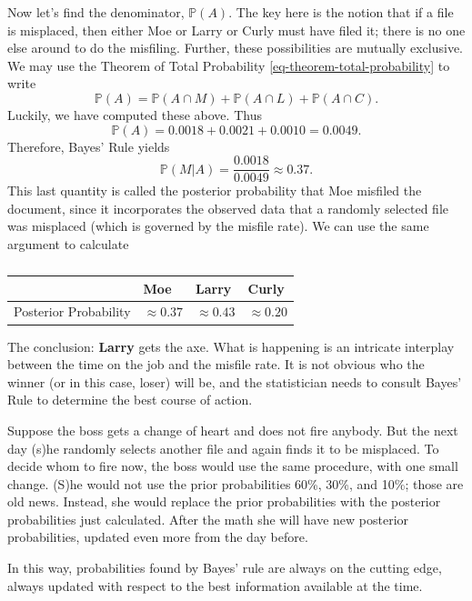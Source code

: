 \documentclass[captions=tableheading]{scrbook}
\begin{document}
\begin{example}
Now let's find the denominator, \(\mathbb{P}(A)\). The key here is the notion that if a file is misplaced, then either Moe or Larry or Curly must have filed it; there is no one else around to do the misfiling. Further, these possibilities are mutually exclusive. We may use the Theorem of Total Probability \ref{eq-theorem-total-probability} to write
\[ 
\mathbb{P}(A)=\mathbb{P}(A\cap M)+\mathbb{P}(A\cap L)+\mathbb{P}(A\cap C).
\]
Luckily, we have computed these above. Thus
\[
\mathbb{P}(A)=0.0018+0.0021+0.0010=0.0049.
\]
Therefore, Bayes' Rule yields
\[
\mathbb{P}(M|A)=\frac{0.0018}{0.0049}\approx0.37.
\]
This last quantity is called the posterior probability that Moe misfiled the document, since it incorporates the observed data that a randomly selected file was misplaced (which is governed by the misfile rate). We can use the same argument to calculate

\begin{table}[htb]
\caption[Misfiling assistants: posterior]{} 
\begin{center}
\begin{tabular}{llll}
                        &  Moe              &  Larry            &  Curly            \\
\hline
 Posterior Probability  &  \(\approx0.37\)  &  \(\approx0.43\)  &  \(\approx0.20\)  \\
\end{tabular}
\end{center}
\end{table}

The conclusion: \textbf{Larry} gets the axe. What is happening is an intricate interplay between the time on the job and the misfile rate. It is not obvious who the winner (or in this case, loser) will be, and the statistician needs to consult Bayes' Rule to determine the best course of action.
\end{example}

\begin{example}
Suppose the boss gets a change of heart and does not fire anybody. But the next day (s)he randomly selects another file and again finds it to be misplaced. To decide whom to fire now, the boss would use the same procedure, with one small change. (S)he would not use the prior probabilities 60\%, 30\%, and 10\%; those are old news. Instead, she would replace the prior probabilities with the posterior probabilities just calculated. After the math she will have new posterior probabilities, updated even more from the day before.

In this way, probabilities found by Bayes' rule are always on the cutting edge, always updated with respect to the best information available at the time.
\end{example}
\end{document}
